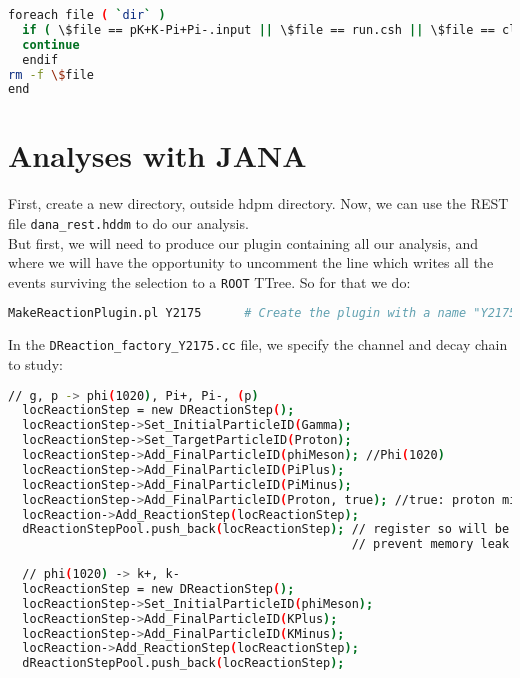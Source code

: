 \documentclass{article}
\begin{document}
\begin{lstlisting}[language=bash]
foreach file ( `dir` )
  if ( \$file == pK+K-Pi+Pi-.input || \$file == run.csh || \$file == clean.csh ) then
  continue
  endif
rm -f \$file                                                                                                                                              
end
\end{lstlisting} 
 
\section{Analyses with JANA}

First, create a new directory, outside hdpm directory.
\newline Now, we can use the REST file \texttt{dana\_rest.hddm} to do our analysis.\\
But first, we will need to produce our plugin containing all our analysis, and where we will have the opportunity to uncomment the line which writes all the events surviving the selection to a \texttt{ROOT} TTree.
So for that we do:

\begin{lstlisting}[language=bash]
  MakeReactionPlugin.pl Y2175      # Create the plugin with a name "Y2175"
\end{lstlisting}

In the \texttt{DReaction\_factory\_Y2175.cc} file, we specify the channel and decay chain to study:

\begin{lstlisting}[language=bash]
  // g, p -> phi(1020), Pi+, Pi-, (p)
  locReactionStep = new DReactionStep();
  locReactionStep->Set_InitialParticleID(Gamma);
  locReactionStep->Set_TargetParticleID(Proton);
  locReactionStep->Add_FinalParticleID(phiMeson); //Phi(1020)
  locReactionStep->Add_FinalParticleID(PiPlus);
  locReactionStep->Add_FinalParticleID(PiMinus);                                                                                                       
  locReactionStep->Add_FinalParticleID(Proton, true); //true: proton missing
  locReaction->Add_ReactionStep(locReactionStep);
  dReactionStepPool.push_back(locReactionStep); // register so will be deleted later
                                                // prevent memory leak
  
  // phi(1020) -> k+, k-
  locReactionStep = new DReactionStep();
  locReactionStep->Set_InitialParticleID(phiMeson);
  locReactionStep->Add_FinalParticleID(KPlus);
  locReactionStep->Add_FinalParticleID(KMinus);
  locReaction->Add_ReactionStep(locReactionStep);
  dReactionStepPool.push_back(locReactionStep);
\end{lstlisting}
\end{document}
